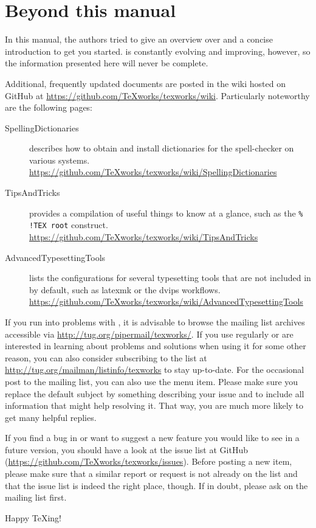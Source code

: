 
\chapter{Beyond this manual}

In this manual, the authors tried to give an overview over {\Tw} and a concise introduction to get you started. {\Tw} is constantly evolving and improving, however, so the information presented here will never be complete.

Additional, frequently updated documents are posted in the wiki hosted on GitHub at \url{https://github.com/TeXworks/texworks/wiki}. Particularly noteworthy are the following pages:
\begin{description}
\item[SpellingDictionaries] describes how to obtain and install dictionaries for the spell-checker on various systems. \url{https://github.com/TeXworks/texworks/wiki/SpellingDictionaries}
\item[TipsAndTricks] provides a compilation of useful things to know at a glance, such as the \verb|% !TEX root| construct. \url{https://github.com/TeXworks/texworks/wiki/TipsAndTricks}
\item[AdvancedTypesettingTools] lists the configurations for several typesetting tools that are not included in {\Tw} by default, such as latexmk or the dvips workflows. \url{https://github.com/TeXworks/texworks/wiki/AdvancedTypesettingTools}
\end{description}

If you run into problems with {\Tw}, it is advisable to browse the mailing list archives accessible via \url{http://tug.org/pipermail/texworks/}. If you use {\Tw} regularly or are interested in learning about problems and solutions when using it for some other reason, you can also consider subscribing to the list at \url{http://tug.org/mailman/listinfo/texworks} to stay up-to-date. For the occasional post to the mailing list, you can also use the \submenu{} menu item. Please make sure you replace the default subject by something describing your issue and to include all information that might help resolving it. That way, you are much more likely to get many helpful replies.

If you find a bug in {\Tw} or want to suggest a new feature you would like to see in a future version, you should have a look at the issue list at GitHub (\url{https://github.com/TeXworks/texworks/issues}). Before posting a new item, please make sure that a similar report or request is not already on the list and that the issue list is indeed the right place, though. If in doubt, please ask on the mailing list first.

Happy {\TeX}ing!